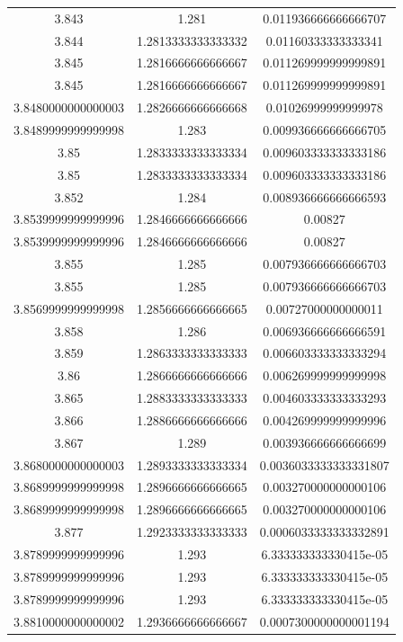 \documentclass[a4paper,12pt]{article}
\begin{document}
\begin{justify}
\begin{scriptsize}
\begin{longtable}{|c|c|c|}
3.843 & 1.281 & 0.011936666666666707 \\
3.844 & 1.2813333333333332 & 0.01160333333333341 \\
3.845 & 1.2816666666666667 & 0.011269999999999891 \\
3.845 & 1.2816666666666667 & 0.011269999999999891 \\
3.8480000000000003 & 1.2826666666666668 & 0.01026999999999978 \\
3.8489999999999998 & 1.283 & 0.009936666666666705 \\
3.85 & 1.2833333333333334 & 0.009603333333333186 \\
3.85 & 1.2833333333333334 & 0.009603333333333186 \\
3.852 & 1.284 & 0.008936666666666593 \\
3.8539999999999996 & 1.2846666666666666 & 0.00827 \\
3.8539999999999996 & 1.2846666666666666 & 0.00827 \\
3.855 & 1.285 & 0.007936666666666703 \\
3.855 & 1.285 & 0.007936666666666703 \\
3.8569999999999998 & 1.2856666666666665 & 0.00727000000000011 \\
3.858 & 1.286 & 0.006936666666666591 \\
3.859 & 1.2863333333333333 & 0.006603333333333294 \\
3.86 & 1.2866666666666666 & 0.006269999999999998 \\
3.865 & 1.2883333333333333 & 0.004603333333333293 \\
3.866 & 1.2886666666666666 & 0.004269999999999996 \\
3.867 & 1.289 & 0.003936666666666699 \\
3.8680000000000003 & 1.2893333333333334 & 0.0036033333333331807 \\
3.8689999999999998 & 1.2896666666666665 & 0.003270000000000106 \\
3.8689999999999998 & 1.2896666666666665 & 0.003270000000000106 \\
3.877 & 1.2923333333333333 & 0.0006033333333332891 \\
3.8789999999999996 & 1.293 & 6.333333333330415e-05 \\
3.8789999999999996 & 1.293 & 6.333333333330415e-05 \\
3.8789999999999996 & 1.293 & 6.333333333330415e-05 \\
3.8810000000000002 & 1.2936666666666667 & 0.0007300000000001194 \\

\end{longtable}
\end{scriptsize}
\end{justify}
\end{document}
